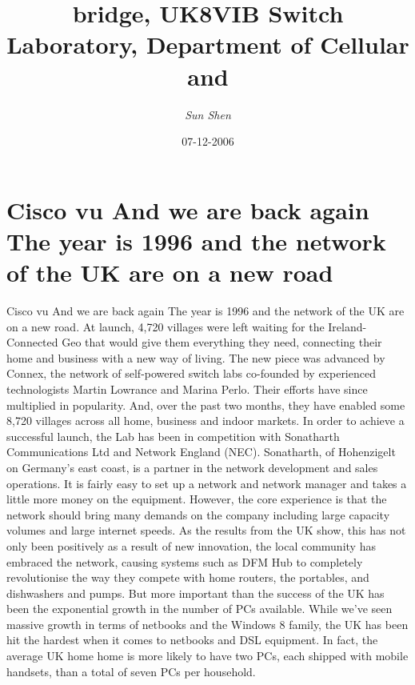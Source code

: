 \documentclass{article}%
\title{bridge, UK8VIB Switch Laboratory, Department of Cellular and}%
\author{\textit{Sun Shen}}%
\date{07-12-2006}%
\begin{document}
%
\normalsize%
\maketitle%
\section{Cisco vu And we are back again\newline%
The year is 1996 and the network of the UK are on a new road}%
\label{sec:CiscovuAndwearebackagainTheyearis1996andthenetworkoftheUKareonanewroad}%
Cisco vu And we are back again\newline%
The year is 1996 and the network of the UK are on a new road. At launch, 4,720 villages were left waiting for the Ireland{-}Connected Geo that would give them everything they need, connecting their home and business with a new way of living.\newline%
The new piece was advanced by Connex, the network of self{-}powered switch labs co{-}founded by experienced technologists Martin Lowrance and Marina Perlo. Their efforts have since multiplied in popularity. And, over the past two months, they have enabled some 8,720 villages across all home, business and indoor markets.\newline%
In order to achieve a successful launch, the Lab has been in competition with Sonatharth Communications Ltd and Network England (NEC). Sonatharth, of Hohenzigelt on Germany’s east coast, is a partner in the network development and sales operations.\newline%
It is fairly easy to set up a network and network manager and takes a little more money on the equipment. However, the core experience is that the network should bring many demands on the company including large capacity volumes and large internet speeds.\newline%
As the results from the UK show, this has not only been positively as a result of new innovation, the local community has embraced the network, causing systems such as DFM Hub to completely revolutionise the way they compete with home routers, the portables, and dishwashers and pumps.\newline%
But more important than the success of the UK has been the exponential growth in the number of PCs available. While we've seen massive growth in terms of netbooks and the Windows 8 family, the UK has been hit the hardest when it comes to netbooks and DSL equipment. In fact, the average UK home home is more likely to have two PCs, each shipped with mobile handsets, than a total of seven PCs per household.\newline%
\end{document}
